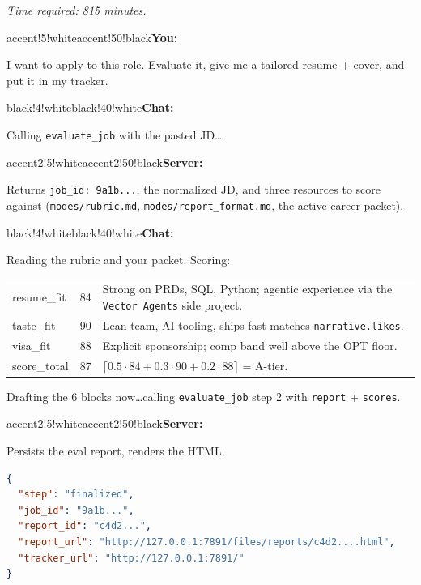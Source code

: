 \documentclass[11pt,letterpaper]{article}
\newcommand{\tool}[1]{\texttt{#1}}
\newenvironment{userturn}{\begin{chatturn}{accent!5!white}{accent!50!black}\textbf{\sffamily\color{accent}You:}\par\medskip}{\end{chatturn}}
\newenvironment{aiturn}{\begin{chatturn}{black!4!white}{black!40!white}\textbf{\sffamily\color{black!70}Chat:}\par\medskip}{\end{chatturn}}
\newenvironment{servturn}{\begin{chatturn}{accent2!5!white}{accent2!50!black}\textbf{\sffamily\color{accent2!60!black}Server:}\par\medskip}{\end{chatturn}}
\begin{document}
\textit{Time required: 8\textendash{}15 minutes.}

\begin{userturn}
I want to apply to this role. Evaluate it, give me a tailored resume + cover, and put it in my tracker.

\medskip
{}
\end{userturn}

\begin{aiturn}
Calling \tool{evaluate\_job} with the pasted JD\dots
\end{aiturn}

\begin{servturn}
Returns \texttt{job\_id: 9a1b...}, the normalized JD, and three resources to score against (\texttt{modes/rubric.md}, \texttt{modes/report\_format.md}, the active career packet).
\end{servturn}

\begin{aiturn}
Reading the rubric and your packet. Scoring:

\smallskip
\begin{tabular}{lll}
\textsf{resume\_fit} & 84 & \footnotesize Strong on PRDs, SQL, Python; agentic experience via the \texttt{Vector Agents} side project. \\
\textsf{taste\_fit}  & 90 & \footnotesize Lean team, AI tooling, ships fast \textemdash{} matches \texttt{narrative.likes}. \\
\textsf{visa\_fit}   & 88 & \footnotesize Explicit sponsorship; comp band well above the OPT floor. \\
\textsf{score\_total} & 87 & \footnotesize $\lceil 0.5 \cdot 84 + 0.3 \cdot 90 + 0.2 \cdot 88 \rceil$ = A-tier. \\
\end{tabular}
\smallskip

Drafting the 6 blocks now\dots calling \tool{evaluate\_job} step 2 with \texttt{report} + \texttt{scores}.
\end{aiturn}

\begin{servturn}
Persists the eval report, renders the HTML.
\begin{lstlisting}[language=json]
{
  "step": "finalized",
  "job_id": "9a1b...",
  "report_id": "c4d2...",
  "report_url": "http://127.0.0.1:7891/files/reports/c4d2....html",
  "tracker_url": "http://127.0.0.1:7891/"
}
\end{lstlisting}
\end{servturn}
\end{document}
